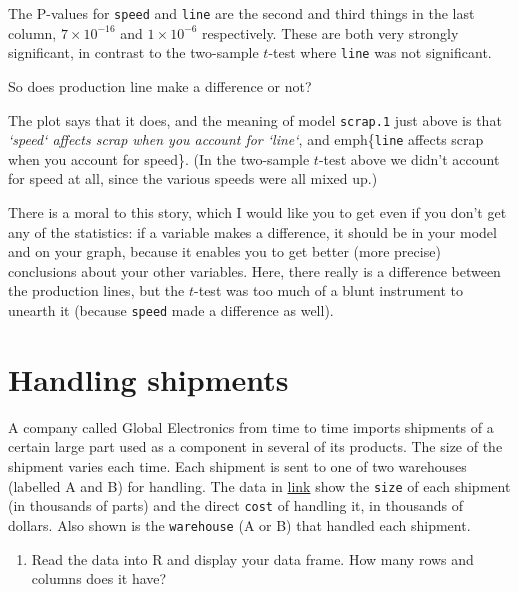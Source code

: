 \documentclass[]{tufte-book}
\providecommand{\tightlist}{%
  \setlength{\itemsep}{0pt}\setlength{\parskip}{0pt}}
\theoremstyle{definition}
\theoremstyle{definition}
\theoremstyle{definition}
\theoremstyle{remark}
\begin{document}
The P-values for \texttt{speed} and \texttt{line} are the second and
third things in the last column, \(7 \times 10^{-16}\) and
\(1 \times 10^{-6}\) respectively. These are both very strongly
significant, in contrast to the two-sample \(t\)-test where
\texttt{line} was not significant.

So does production line make a difference or not?

The plot says that it does, and the meaning of model \texttt{scrap.1}
just above is that \emph{`speed` affects scrap when you account
for `line`}, and emph\{\texttt{line} affects scrap when you account for
speed\}. (In the two-sample \(t\)-test above we didn't account for speed
at all, since the various speeds were all mixed up.)

There is a moral to this story, which I would like you to get even if
you don't get any of the statistics: if a variable makes a difference,
it should be in your model and on your graph,
because it enables you to get better (more precise) conclusions about
your other variables. Here, there really is a difference between the
production lines, but the \(t\)-test was too much of a blunt instrument
to unearth it (because \texttt{speed} made a difference as well).

\hypertarget{handling-shipments}{%
\section{Handling shipments}\label{handling-shipments}}

A company called Global Electronics from time to time imports shipments
of a certain large part used as a component in several of its products.
The size of the shipment varies each time. Each shipment is sent to one
of two warehouses (labelled A and B) for handling. The data in
\href{http://www.utsc.utoronto.ca/~butler/c32/global.csv}{link} show the
\texttt{size} of each shipment (in thousands of parts) and the direct
\texttt{cost} of handling it, in thousands of dollars. Also shown is the
\texttt{warehouse} (A or B) that handled each shipment.

\begin{enumerate}
\def\labelenumi{(\alph{enumi})}
\tightlist
\item
  Read the data into R and display your data frame. How many rows and
  columns does it have?
\end{enumerate}
\end{document}
